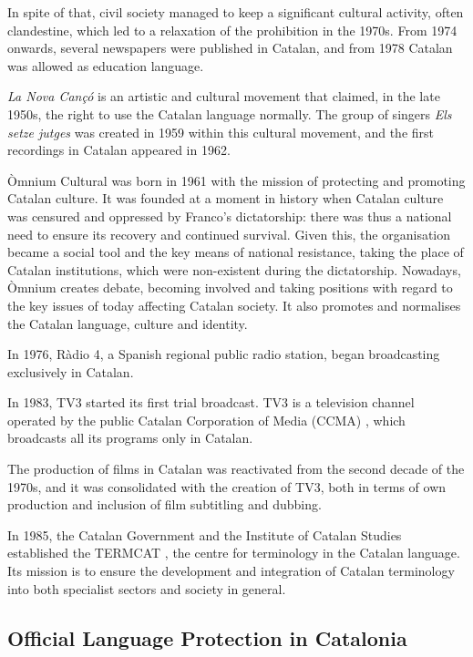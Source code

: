 \begin{multicols}{2}
In spite of that, civil society managed to keep a significant cultural activity, often clandestine, which led to a relaxation of the prohibition in the 1970s. From 1974 onwards, several newspapers were published in Catalan, and from 1978 Catalan was allowed as education language.

 \textit{La Nova Cançó} is an artistic and cultural movement that claimed, in the late 1950s, the right to use the Catalan language normally. The group of singers \textit{Els setze jutges} was created in 1959 within this cultural movement, and the first recordings in Catalan appeared in 1962.

Òmnium Cultural \cite{CAT-omniumcultural} was born in 1961 with the mission of protecting and promoting Catalan culture. It was founded at a moment in history when Catalan culture was censured and oppressed by Franco’s dictatorship: there was thus a national need to ensure its recovery and continued survival. Given this, the organisation became a social tool and the key means of national resistance, taking the place of Catalan institutions, which were non-existent during the dictatorship. Nowadays, Òmnium creates debate, becoming involved and taking positions with regard to the key issues of today affecting Catalan society. It also promotes and normalises the Catalan language, culture and identity.

In 1976, Ràdio 4, a Spanish regional public radio station, began broadcasting exclusively in Catalan.

In 1983, TV3 started its first trial broadcast. TV3 is a television channel operated by the public Catalan Corporation of Media (CCMA) \cite{CAT-CCMA}, which broadcasts all its programs only in Catalan.

The production of films in Catalan was reactivated from the second decade of the 1970s, and it was consolidated with the creation of TV3, both in terms of own production and inclusion of film subtitling and dubbing.

In 1985, the Catalan Government and the Institute of Catalan Studies established the TERMCAT \cite{CAT-TERMCAT}, the centre for terminology in the Catalan language. Its mission is to ensure the development and integration of Catalan terminology into both specialist sectors and society in general.

\subsection{Official Language Protection in Catalonia}


\end{multicols}

